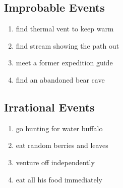 \documentclass[11pt,letterpaper]{article}
\begin{document}
\subsection{Improbable Events}

\begin{enumerate}[resume]
    \item find thermal vent to keep warm
    \item find stream showing the path out
    \item meet a former expedition guide
    \item find an abandoned bear cave
\end{enumerate}

\subsection{Irrational Events}

\begin{enumerate}[resume]
    \item go hunting for water buffalo
    \item eat random berries and leaves
    \item venture off independently
    \item eat all his food immediately
\end{enumerate}
\end{document}

